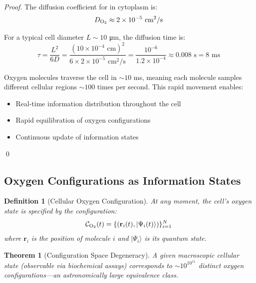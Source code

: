 \documentclass[12pt,a4paper]{article}
\newtheorem{theorem}{Theorem}
\newtheorem{definition}{Definition}
\begin{document}
\begin{proof}
The diffusion coefficient for  in cytoplasm is:
\begin{equation}
D_{\ce{O2}} \approx 2 \times 10^{-5} \text{ cm}^2/\text{s}
\end{equation}

For a typical cell diameter $L \sim 10$ μm, the diffusion time is:
\begin{equation}
\tau = \frac{L^2}{6D} = \frac{(10 \times 10^{-4} \text{ cm})^2}{6 \times 2 \times 10^{-5} \text{ cm}^2/\text{s}} = \frac{10^{-6}}{1.2 \times 10^{-4}} \approx 0.008 \text{ s} = 8 \text{ ms}
\end{equation}

Oxygen molecules traverse the cell in $\sim 10$ ms, meaning each molecule samples different cellular regions $\sim 100$ times per second. This rapid movement enables:
\begin{itemize}
\item Real-time information distribution throughout the cell
\item Rapid equilibration of oxygen configurations
\item Continuous update of information states
\end{itemize}
\qed
\end{proof}

\subsection{Oxygen Configurations as Information States}

\begin{definition}[Cellular Oxygen Configuration]
\label{def:oxygen_configuration}
At any moment, the cell's oxygen state is specified by the configuration:
\begin{equation}
\mathcal{C}_{\ce{O2}}(t) = \{(\mathbf{r}_i(t), |\Psi_i(t)\rangle)\}_{i=1}^{N}
\end{equation}
where $\mathbf{r}_i$ is the position of molecule $i$ and $|\Psi_i\rangle$ is its quantum state.
\end{definition}

\begin{theorem}[Configuration Space Degeneracy]
\label{thm:config_degeneracy}
A given macroscopic cellular state (observable via biochemical assays) corresponds to $\sim 10^{10^{11}}$ distinct oxygen configurations—an astronomically large equivalence class.
\end{theorem}
\end{document}
